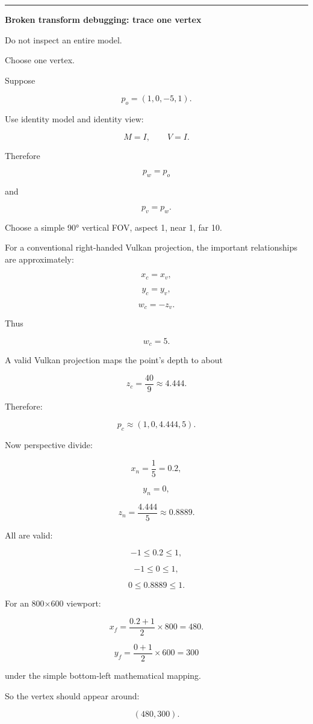 \begin{center}\rule{0.5\linewidth}{0.5pt}\end{center}

\textbf{Broken transform debugging: trace one vertex}

Do not inspect an entire model.

Choose one vertex.

Suppose

\[
p_o=
(1,0,-5,1).
\]

Use identity model and identity view:

\[
M=I,\qquad V=I.
\]

Therefore

\[
p_w=p_o
\]

and

\[
p_v=p_w.
\]

Choose a simple 90° vertical FOV, aspect 1, near 1, far 10.

For a conventional right-handed Vulkan projection, the important relationships are approximately:

\[
x_c=x_v,
\]

\[
y_c=y_v,
\]

\[
w_c=-z_v.
\]

Thus

\[
w_c=5.
\]

A valid Vulkan projection maps the point's depth to about

\[
z_c=\frac{40}{9}\approx4.444.
\]

Therefore:

\[
p_c\approx
(1,0,4.444,5).
\]

Now perspective divide:

\[
x_n=\frac15=0.2,
\]

\[
y_n=0,
\]

\[
z_n=\frac{4.444}{5}\approx0.8889.
\]

All are valid:

\[
-1\le0.2\le1,
\]

\[
-1\le0\le1,
\]

\[
0\le0.8889\le1.
\]

For an 800×600 viewport:

\[
x_f=
\frac{0.2+1}{2}\times800
=
480.
\]

\[
y_f=
\frac{0+1}{2}\times600
=
300
\]

under the simple bottom-left mathematical mapping.

So the vertex should appear around:

\[
\boxed{(480,300)}.
\]

